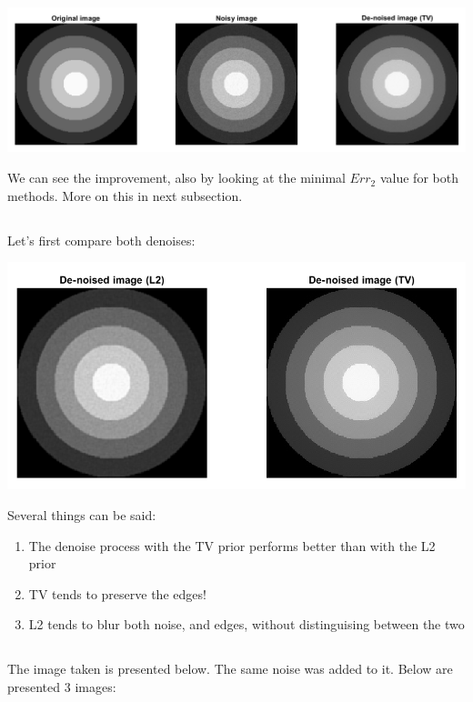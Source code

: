 \documentclass[a4paper]{iacas}
\begin{document}
\vskip 0.1in
\begin{minipage}{0.5\textwidth}
\centering
	\includegraphics[scale=0.5]{output/q5/TV_denoise.png}
\end{minipage}
\vskip 0.1in

We can see the improvement, also by looking at the minimal $Err_{2}$ value for both methods. More on this in next subsection.

\subsection{}
Let's first compare both denoises:
\vskip 0.1in
\begin{minipage}{0.5\textwidth}
\centering
	\includegraphics[scale=0.7]{output/q5/L2_TV.png}
\end{minipage}
\vskip 0.1in

Several things can be said:

\begin{enumerate}
\item The denoise process with the TV prior performs better than with the L2 prior
\item TV tends to preserve the edges!
\item L2 tends to blur both noise, and edges, without distinguising between the two
\end{enumerate}


\subsection{}
The image taken is presented below. The same noise was added to it. Below are presented 3 images:
\end{document}
